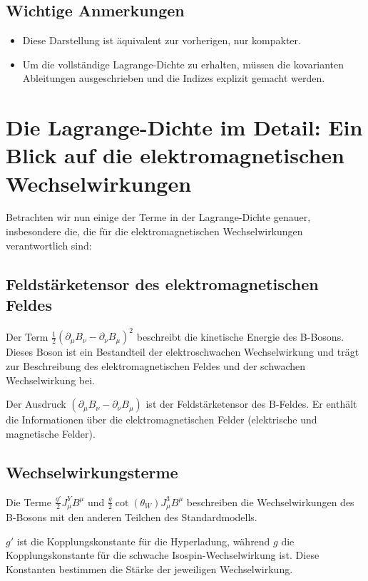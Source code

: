 \documentclass{article}
\begin{document}
	\subsection{Wichtige Anmerkungen}
	
	\begin{itemize}
		\item Diese Darstellung ist äquivalent zur vorherigen, nur kompakter.
		\item Um die vollständige Lagrange-Dichte zu erhalten, müssen die kovarianten Ableitungen ausgeschrieben und die Indizes explizit gemacht werden.
	\end{itemize}
	
	\section{Die Lagrange-Dichte im Detail: Ein Blick auf die elektromagnetischen Wechselwirkungen}
	
	Betrachten wir nun einige der Terme in der Lagrange-Dichte genauer, insbesondere die, die für die elektromagnetischen Wechselwirkungen verantwortlich sind:
	
	\subsection{Feldstärketensor des elektromagnetischen Feldes}
	
	Der Term $\frac{1}{2} (\partial_\mu B_\nu - \partial_\nu B_\mu)^2$ beschreibt die kinetische Energie des B-Bosons. Dieses Boson ist ein Bestandteil der elektroschwachen Wechselwirkung und trägt zur Beschreibung des elektromagnetischen Feldes und der schwachen Wechselwirkung bei.
	
	Der Ausdruck $(\partial_\mu B_\nu - \partial_\nu B_\mu)$ ist der Feldstärketensor des B-Feldes. Er enthält die Informationen über die elektromagnetischen Felder (elektrische und magnetische Felder).
	
	\subsection{Wechselwirkungsterme}
	
	Die Terme $\frac{g'}{2} J_\mu^Y B^\mu$ und $\frac{g}{2} \cot(\theta_W) J_\mu^3 B^\mu$ beschreiben die Wechselwirkungen des B-Bosons mit den anderen Teilchen des Standardmodells.
	
	$g'$ ist die Kopplungskonstante für die Hyperladung, während $g$ die Kopplungskonstante für die schwache Isospin-Wechselwirkung ist. Diese Konstanten bestimmen die Stärke der jeweiligen Wechselwirkung.
	
\end{document}
